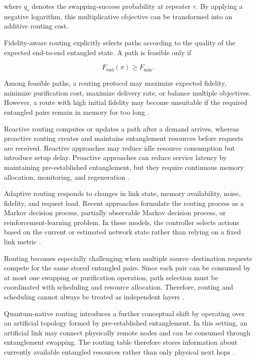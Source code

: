 where $q_r$ denotes the swapping-success probability at repeater $r$. By applying a negative logarithm, this multiplicative objective can be transformed into an additive routing cost.

Fidelity-aware routing explicitly selects paths according to the quality of the expected end-to-end entangled state. A path is feasible only if

\begin{equation}
    F_{\mathrm{end}}(\pi)
    \geq
    F_{\min}.
\end{equation}

Among feasible paths, a routing protocol may maximize expected fidelity, minimize purification cost, maximize delivery rate, or balance multiple objectives. However, a route with high initial fidelity may become unsuitable if the required entangled pairs remain in memory for too long \cite{wang2024fidelity,halder2024optimal,liu2023quantum}.

Reactive routing computes or updates a path after a demand arrives, whereas proactive routing creates and maintains entanglement resources before requests are received. Reactive approaches may reduce idle resource consumption but introduce setup delay. Proactive approaches can reduce service latency by maintaining pre-established entanglement, but they require continuous memory allocation, monitoring, and regeneration \cite{zhao2023dynamic,gao2024entanglement}.

Adaptive routing responds to changes in link state, memory availability, noise, fidelity, and request load. Recent approaches formulate the routing process as a Markov decision process, partially observable Markov decision process, or reinforcement-learning problem. In these models, the controller selects actions based on the current or estimated network state rather than relying on a fixed link metric \cite{das2021adaptive,xu2023quantumnetwork,li2024adaptive}.

Routing becomes especially challenging when multiple source--destination requests compete for the same stored entangled pairs. Since each pair can be consumed by at most one swapping or purification operation, path selection must be coordinated with scheduling and resource allocation. Therefore, routing and scheduling cannot always be treated as independent layers \cite{dahlberg2022routing,chen2023adaptive,muralidharan2022quantum}.

Quantum-native routing introduces a further conceptual shift by operating over an artificial topology formed by pre-established entanglement. In this setting, an artificial link may connect physically remote nodes and can be consumed through entanglement swapping. The routing table therefore stores information about currently available entangled resources rather than only physical next hops \cite{caleffi2025quantumarchitecture,lee2022router}.

